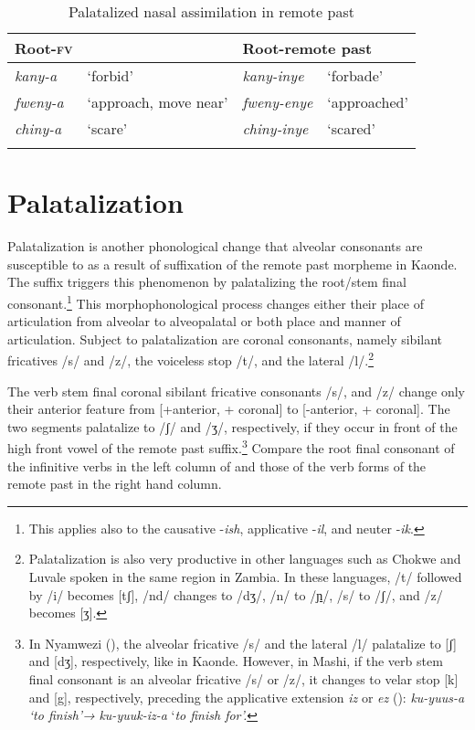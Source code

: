 \documentclass[output=paper]{langsci/langscibook}
\begin{document}
\begin{table}
\begin{tabularx}{\textwidth}{lXlX}
\lsptoprule
Root-\textsc{fv} &  & \multicolumn{2}{l}{Root-remote past} \\
\midrule 
\textit{kany-a} & `forbid' & \textit{kany-inye} & `forbade' \\
\textit{fweny-a} & `approach, move near' & \textit{fweny-enye} & `approached' \\
\textit{chiny-a} & `scare' & \textit{chiny-inye} & `scared' \\

\lspbottomrule
\end{tabularx}

\caption{Palatalized nasal assimilation in remote past}
\label{tab:8.kawasha}

 \end{table}


\section{Palatalization} \label{§3:palatalization.kawasha}

Palatalization is another phonological change that alveolar consonants are susceptible to as a result of suffixation of the remote past morpheme in Kaonde. The suffix triggers this phenomenon by palatalizing the root/stem final consonant.\footnote{This applies also to the causative -\textit{ish}, applicative -\textit{il}, and neuter -\textit{ik}.} This morphophonological process changes either their place of articulation from alveolar to alveopalatal or both place and manner of articulation. Subject to palatalization are coronal consonants, namely sibilant fricatives /s/ and /z/, the voiceless stop /t/, and the lateral /l/.\footnote{Palatalization is also very productive in other languages such as Chokwe and Luvale spoken in the same region in  Zambia. In these languages, /t/ followed by /i/ becomes [tʃ], /nd/ changes to /dʒ/, /n/ to /\href{http://en.wikipedia.org/wiki/Ɲ}{ɲ}/, /s/ to /ʃ/, and /z/ becomes [ʒ].} 

The verb stem final coronal sibilant fricative consonants /s/, and /z/ change only their anterior feature from [+anterior, + coronal] to [-anterior, + coronal]. The two segments palatalize to /ʃ/ and /ʒ/, respectively, if they occur in front of the high front vowel of the remote past suffix.\footnote{In Nyamwezi (\citealt{magangaschadeberg1992}), the alveolar fricative /s/ and the lateral /l/ palatalize to [ʃ] and [dʒ], respectively, like in Kaonde. However, in Mashi, if the verb stem final consonant is an alveolar fricative /s/ or /z/, it changes to velar stop [k] and [g], respectively, preceding the applicative extension \textit{iz} or \textit{ez} (\citealt{bashi2008}): \textit{ku-yuus-a }\textit{\textup{‘to finish’}}\textit{\textup{→}} \textit{ku-yuuk-iz-a} ‘\textit{\textup{to finish for’.}}} Compare the root final consonant of the infinitive verbs in the left column of  and those of the verb forms of the remote past in the right hand column.
\end{document}
